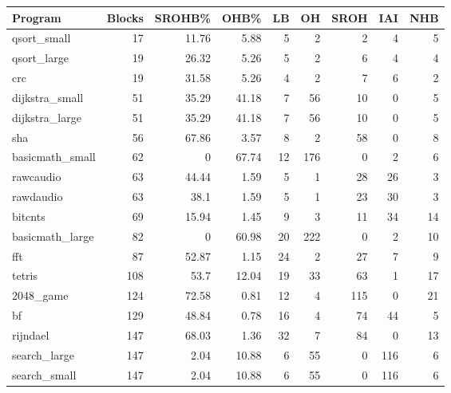\begin{tabular}{l|r|r|r|r|r|r|r|r}
\hline
 Program         &   Blocks &   SROHB\% &   OHB\% &   LB &   OH &   SROH &   IAI &   NHB \\
\hline
 qsort\_small     &       17 &    11.76 &   5.88 &    5 &    2 &      2 &     4 &     5 \\
 \hline
 qsort\_large     &       19 &    26.32 &   5.26 &    5 &    2 &      6 &     4 &     4 \\
 \hline
 crc             &       19 &    31.58 &   5.26 &    4 &    2 &      7 &     6 &     2 \\
 \hline
 dijkstra\_small  &       51 &    35.29 &  41.18 &    7 &   56 &     10 &     0 &     5 \\
 \hline
 dijkstra\_large  &       51 &    35.29 &  41.18 &    7 &   56 &     10 &     0 &     5 \\
 \hline
 sha             &       56 &    67.86 &   3.57 &    8 &    2 &     58 &     0 &     8 \\
 \hline
 basicmath\_small &       62 &     0    &  67.74 &   12 &  176 &      0 &     2 &     6 \\
 \hline
 rawcaudio       &       63 &    44.44 &   1.59 &    5 &    1 &     28 &    26 &     3 \\
 \hline
 rawdaudio       &       63 &    38.1  &   1.59 &    5 &    1 &     23 &    30 &     3 \\
 \hline
 bitcnts         &       69 &    15.94 &   1.45 &    9 &    3 &     11 &    34 &    14 \\
 \hline
 basicmath\_large &       82 &     0    &  60.98 &   20 &  222 &      0 &     2 &    10 \\
 \hline
 fft             &       87 &    52.87 &   1.15 &   24 &    2 &     27 &     7 &     9 \\
 \hline
 tetris          &      108 &    53.7  &  12.04 &   19 &   33 &     63 &     1 &    17 \\
 \hline
 2048\_game       &      124 &    72.58 &   0.81 &   12 &    4 &    115 &     0 &    21 \\
 \hline
 bf              &      129 &    48.84 &   0.78 &   16 &    4 &     74 &    44 &     5 \\
 \hline
 rijndael        &      147 &    68.03 &   1.36 &   32 &    7 &     84 &     0 &    13 \\
 \hline
 search\_large    &      147 &     2.04 &  10.88 &    6 &   55 &      0 &   116 &     6 \\
 \hline
 search\_small    &      147 &     2.04 &  10.88 &    6 &   55 &      0 &   116 &     6 \\

\end{tabular}

